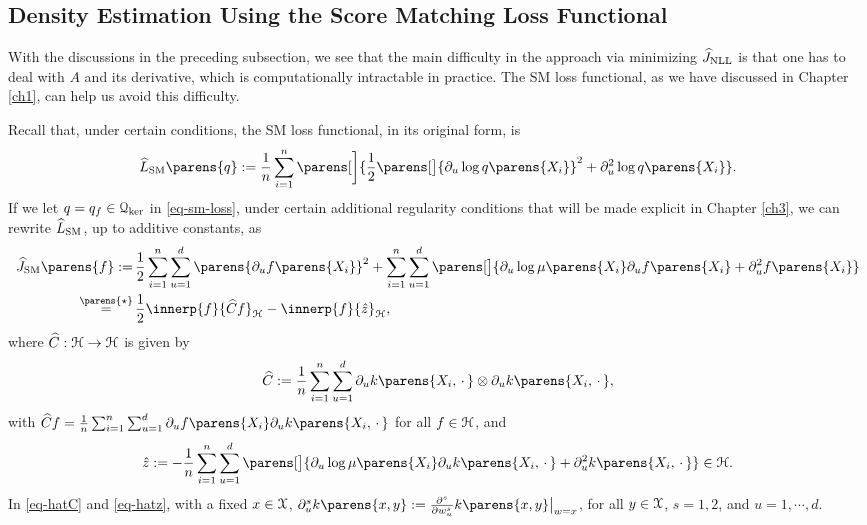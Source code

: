 \subsection{Density Estimation Using the Score Matching Loss Functional}\label{subsection-sm-kef}


With the discussions in the preceding subsection, we see that the main difficulty in the approach via minimizing $\widehat{J}_{\mathrm{NLL}}$ is that one has to deal with $A$ and its derivative, which is computationally intractable in practice. The SM loss functional, as we have discussed in Chapter \ref{ch1}, can help us avoid this difficulty. 

Recall that, under certain conditions, the SM loss functional, in its original form, is 
\begin{align}\label{eq-sm-loss}
	\widehat{L}_{\SM} \parens{q} := \frac{1}{n} \sum_{i=1}^n \parens[\bigg]{\frac{1}{2} \parens[\big]{\partial_u \log q \parens{X_i}}^2 + \partial_u^2 \log q \parens{X_i}}. 
\end{align}
If we let $q = q_f \in \mathcal{Q}_{\ker}$ in \eqref{eq-sm-loss}, under certain additional regularity conditions that will be made explicit in Chapter \ref{ch3}, we can rewrite $\widehat{L}_{\mathrm{SM}}$, up to additive constants, as 
\begin{align}
	\widehat{J}_{\SM} \parens{f} := & \, \frac{1}{2} \sum_{i=1}^n \sum_{u=1}^d \parens{\partial_u f \parens{X_i}}^2 + \sum_{i=1}^n \sum_{u=1}^d \parens[\big]{\partial_u \log \mu \parens{X_i} \partial_u f \parens{X_i} + \partial_u^2 f \parens{X_i} } \nonumber \\
	\stackrel{\parens{\star}}{=} & \, \frac{1}{2} \innerp{f}{\widehat{C} f}_{\calH} - \innerp{f}{\hat{z}}_{\calH}, \label{eq-sm-loss-kef}
\end{align}
where $\widehat{C}: \mathcal{H} \to \mathcal{H}$ is given by 
\begin{align}\label{eq-hatC}
	\widehat{C} := \frac{1}{n} \sum_{i=1}^n \sum_{u=1}^d \partial_u k \parens{X_i, \,\cdot\,} \otimes \partial_u k \parens{X_i, \,\cdot\,}, 
\end{align}
with $\widehat{C} f = \frac{1}{n} \sum_{i=1}^n \sum_{u=1}^d \partial_u f \parens{X_i} \partial_u k \parens{X_i, \,\cdot\,}$ for all $f \in \mathcal{H}$, and 
\begin{align}\label{eq-hatz}
	\hat{z} := - \frac{1}{n} \sum_{i=1}^n \sum_{u=1}^d \parens[\big]{\partial_u \log \mu \parens{X_i} \partial_u k \parens{X_i, \,\cdot\,} + \partial_u^2 k \parens{X_i, \,\cdot\,}} \in \calH. 
\end{align}
In \eqref{eq-hatC} and \eqref{eq-hatz}, with a fixed $x \in \mathcal{X}$, $\partial_u^s k \parens{x, y} := \frac{\partial^s}{\partial w_u^s} k \parens{x, y}\big\vert_{w = x}$, for all $y \in \mathcal{X}$, $s = 1, 2$, and $u = 1, \cdots, d$. 
